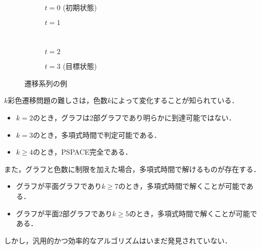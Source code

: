 \begin{figure}[htbp]
  \centering
  \begin{subfigure}{0.4\hsize}
    \centering
    
    \caption{$t=0$ (初期状態)}
   \end{subfigure}
   \hspace{1cm}
   \begin{subfigure}{0.4\hsize}
    \centering
    
    \caption{$t=1$}
   \end{subfigure}
   \\
   \begin{subfigure}{0.4\hsize}
    \centering
    
    \caption{$t=2$}
   \end{subfigure}
   \hspace{1cm}
   \begin{subfigure}{0.4\hsize}
    \centering
    
    \caption{$t=3$ (目標状態)}
   \end{subfigure}

   \caption{遷移系列の例}
   \label{fig:ans_varrecol}
\end{figure}

$k$彩色遷移問題の難しさは，色数$k$によって変化することが知られている． 
\begin{itemize}
  \item $k = 2$のとき，グラフは2部グラフであり明らかに到達可能ではない．
  \item $k = 3$のとき，多項式時間で判定可能である． \cite{CHM2008:iwoca}
  \item $k \geq 4$のとき，PSPACE完全である． \cite{BC2009:tcs}
\end{itemize}
また，グラフと色数に制限を加えた場合，多項式時間で解けるものが存在する． \cite{BC2009:tcs}
\begin{itemize}
  \item グラフが平面グラフであり$k \geq 7$のとき，多項式時間で解くことが可能である．
  \item グラフが平面2部グラフであり$k \geq 5$のとき，多項式時間で解くことが可能である．
\end{itemize}
しかし，汎用的かつ効率的なアルゴリズムはいまだ発見されていない．

